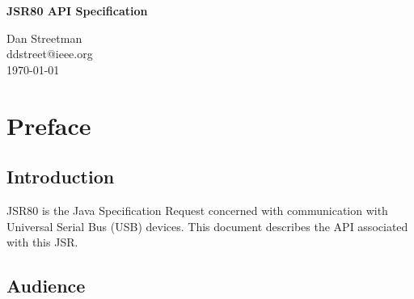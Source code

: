 \documentclass{article}
\newcommand{\mytitle}[0]{JSR80 API Specification}
\newcommand{\myauthor}[0]{Dan Streetman}
\newcommand{\mydate}[0]{\today}
\begin{document}
\pagestyle{empty}


%

\begin{titlepage}

\begin{center}
\Huge{\textbf{\mytitle}}
\end{center}

\vfill
\vfill

\begin{flushright}
\large{\myauthor}
\\
\large{ddstreet@ieee.org}
\\
\large{\mydate}
\end{flushright}

\vfill

\end{titlepage}

%

\pagestyle{fancy}
\fancyhf{}
\renewcommand{\sectionmark}[1]{\markright{\emph{\mytitle}}}
\renewcommand{\subsectionmark}[1]{\markright{\emph{\mytitle}}}
\renewcommand{\subsubsectionmark}[1]{\markright{\emph{\mytitle}}}
\fancyhead[LE,RO]{\bfseries\thepage}
\fancyhead[LO]{\rightmark}

%

\tableofcontents

\listoftables

\listoffigures

\pagebreak

%

\section{Preface}

\subsection{Introduction}

JSR80 is the Java Specification Request concerned with communication with
Universal Serial Bus (USB) devices.  This document describes the API associated
with this JSR.  

\mysubsectionend

\subsection{Audience}
\end{document}
